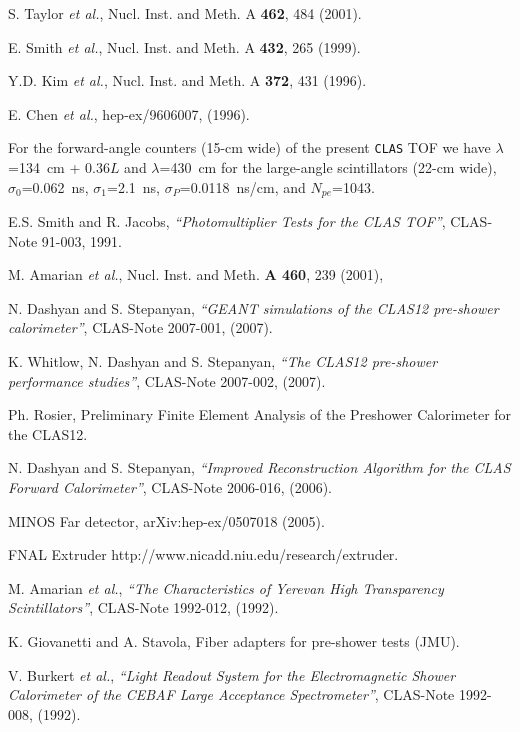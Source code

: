 \begin{thebibliography}{199}
 S. Taylor {\it et al.}, Nucl. Inst. and Meth. A {\bf 462}, 
484 (2001).

%
%

E. Smith {\it et al.}, Nucl. Inst. and Meth. A {\bf 432}, 265 (1999).

Y.D. Kim {\it et al.}, Nucl. Inst. and Meth. A {\bf 372}, 431 (1996). 

E. Chen {\it et al.}, hep-ex/9606007, (1996).

For the forward-angle counters (15-cm wide) of the present {\tt CLAS} 
TOF we have $\lambda$=134~cm + 0.36$L$ and $\lambda$=430~cm for the 
large-angle scintillators (22-cm wide), $\sigma_0$=0.062~ns, 
$\sigma_1$=2.1~ns, $\sigma_P$=0.0118~ns/cm, and $N_{pe}$=1043.

E.S. Smith and R. Jacobs, {\it ``Photomultiplier Tests for the CLAS TOF''},
CLAS-Note 91-003, 1991.

%
%

M. Amarian {\it et al.}, Nucl. Inst. and Meth. {\bf A 460}, 239 (2001),

N. Dashyan and S. Stepanyan, {\it ``GEANT simulations of the CLAS12 
pre-shower calorimeter''}, CLAS-Note 2007-001, (2007).

K. Whitlow, N. Dashyan and S. Stepanyan, {\it ``The CLAS12 pre-shower 
performance studies''}, CLAS-Note 2007-002, (2007).

Ph. Rosier, Preliminary Finite Element Analysis of the Preshower 
Calorimeter for the CLAS12.

N. Dashyan and S. Stepanyan, {\it ``Improved Reconstruction Algorithm for
the CLAS Forward Calorimeter''}, CLAS-Note 2006-016, (2006).

MINOS Far detector, arXiv:hep-ex/0507018 (2005).

FNAL Extruder http://www.nicadd.niu.edu/research/extruder.

M. Amarian {\it et al.}, {\it ``The Characteristics of Yerevan High Transparency Scintillators''}, CLAS-Note 1992-012, (1992).

K. Giovanetti and A. Stavola, Fiber adapters for pre-shower tests (JMU).

V. Burkert {\it et al.}, {\it ``Light Readout System for the 
Electromagnetic Shower Calorimeter of the CEBAF Large Acceptance 
Spectrometer''}, CLAS-Note 1992-008, (1992).


\end{thebibliography}

